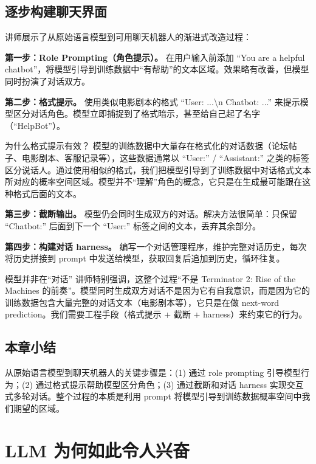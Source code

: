 \documentclass[a4paper]{article}
\begin{document}
\subsection{逐步构建聊天界面}

讲师展示了从原始语言模型到可用聊天机器人的渐进式改造过程：

\textbf{第一步：Role Prompting（角色提示）。} 在用户输入前添加 ``You are a helpful chatbot''，将模型引导到训练数据中``有帮助''的文本区域。效果略有改善，但模型同时扮演了对话双方。

\textbf{第二步：格式提示。} 使用类似电影剧本的格式 ``User: ...\textbackslash n Chatbot: ...'' 来提示模型区分对话角色。模型立即捕捉到了格式暗示，甚至给自己起了名字（``HelpBot''）。

\begin{knowledgebox}{为什么格式提示有效？}
模型的训练数据中大量存在格式化的对话数据（论坛帖子、电影剧本、客服记录等），这些数据通常以 ``User:'' / ``Assistant:'' 之类的标签区分说话人。通过使用相似的格式，我们把模型引导到了训练数据中对话格式文本所对应的概率空间区域。模型并不``理解''角色的概念，它只是在生成最可能跟在这种格式后面的文本。
\end{knowledgebox}

\textbf{第三步：截断输出。} 模型仍会同时生成双方的对话。解决方法很简单：只保留 ``Chatbot:'' 后面到下一个 ``User:'' 标签之间的文本，丢弃其余部分。

\textbf{第四步：构建对话 harness。} 编写一个对话管理程序，维护完整对话历史，每次将历史拼接到 prompt 中发送给模型，获取回复后追加到历史，循环往复。

\begin{warningbox}{模型并非在``对话''}
讲师特别强调，这整个过程``不是 Terminator 2: Rise of the Machines 的前奏''。模型同时生成双方对话不是因为它有自我意识，而是因为它的训练数据包含大量完整的对话文本（电影剧本等），它只是在做 next-word prediction。我们需要工程手段（格式提示 + 截断 + harness）来约束它的行为。
\end{warningbox}

\subsection{本章小结}

从原始语言模型到聊天机器人的关键步骤是：(1) 通过 role prompting 引导模型行为；(2) 通过格式提示帮助模型区分角色；(3) 通过截断和对话 harness 实现交互式多轮对话。整个过程的本质是利用 prompt 将模型引导到训练数据概率空间中我们期望的区域。

\section{LLM 为何如此令人兴奋}
\end{document}
